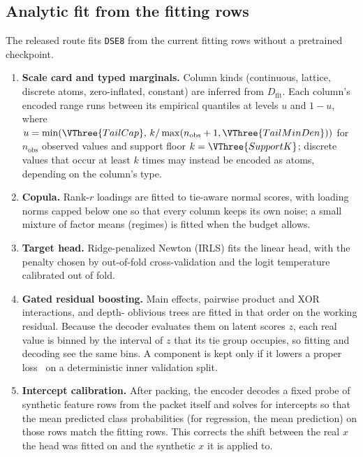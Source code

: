\subsection{Analytic fit from the fitting rows}\label{sec:fit}
The released route fits \texttt{DSE8} from the current fitting rows without a pretrained checkpoint.
\begin{enumerate}
  \item \textbf{Scale card and typed marginals.} Column kinds (continuous, lattice, discrete atoms, zero-inflated, constant) are inferred from $D_{\mathrm{fit}}$. Each column's encoded range runs between its empirical quantiles at levels $u$ and $1-u$, where $u=\min(\VThree{TailCap},\,k/\max(n_{\mathrm{obs}}+1,\VThree{TailMinDen}))$ for $n_{\mathrm{obs}}$ observed values and support floor $k=\VThree{SupportK}$; discrete values that occur at least $k$ times may instead be encoded as atoms, depending on the column's type.
  \item \textbf{Copula.} Rank-$r$ loadings are fitted to tie-aware normal scores, with loading norms capped below one so that every column keeps its own noise; a small mixture of factor means (regimes) is fitted when the budget allows.
  \item \textbf{Target head.} Ridge-penalized Newton (IRLS) fits the linear head, with the penalty chosen by out-of-fold cross-validation and the logit temperature calibrated out of fold.
  \item \textbf{Gated residual boosting.} Main effects, pairwise product and XOR interactions, and depth- oblivious trees are fitted in that order on the working residual. Because the decoder evaluates them on latent scores $z$, each real value is binned by the interval of $z$ that its tie group occupies, so fitting and decoding see the same bins. A component is kept only if it lowers a proper loss~\citep{gneiting2007strictly} on a deterministic inner validation split.
  \item \textbf{Intercept calibration.} After packing, the encoder decodes a fixed probe of synthetic feature rows from the packet itself and solves for intercepts so that the mean predicted class probabilities (for regression, the mean prediction) on those rows match the fitting rows. This corrects the shift between the real $x$ the head was fitted on and the synthetic $x$ it is applied to.
\end{enumerate}

